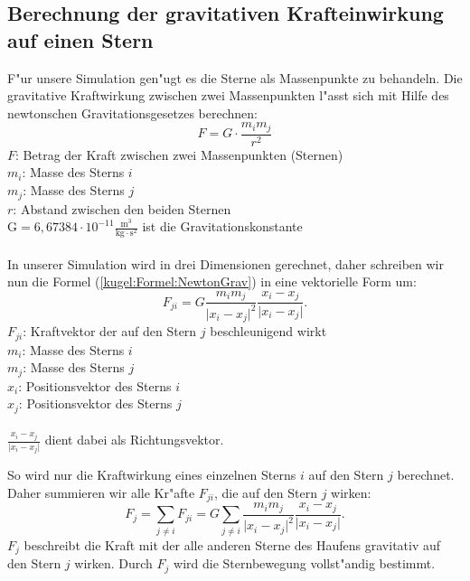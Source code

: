 \begin{refsection}
	\subsection{Berechnung der gravitativen Krafteinwirkung auf einen Stern} \label{kugel:subsection:Kraftformel}
	F"ur unsere Simulation gen"ugt es die Sterne als Massenpunkte zu behandeln. 
	Die gravitative Kraftwirkung zwischen zwei Massenpunkten l"asst sich mit Hilfe des newtonschen Gravitationsgesetzes berechnen:
	\begin{equation}
		F = G \cdot \dfrac{m_i m_j}{r^2}
		\label{kugel:Formel:NewtonGrav}
	\end{equation}
	$F$: Betrag der Kraft zwischen zwei Massenpunkten (Sternen) \\
	$m_i$: Masse des Sterns $i$ \\
	$m_j$: Masse des Sterns $j$ \\
	$r$: Abstand zwischen den beiden Sternen \\
	$\mathrm{G = 6,67384 \cdot 10^{-11} \frac{m^3}{kg \cdot s^2}}$ ist die Gravitationskonstante \\ \\
	In unserer Simulation wird in drei Dimensionen gerechnet, daher schreiben wir nun die Formel (\ref{kugel:Formel:NewtonGrav}) in eine vektorielle Form um:
	\begin{equation}
		F_{ji} = G \dfrac{m_i m_j}{\lvert x_i -  x_j \lvert^2} \dfrac{x_i - x_j}{\lvert x_i - x_j \lvert}
		\label{kugel:Formel:NewtonGravVek}.
	\end{equation}
	$F_{ji}$: Kraftvektor der auf den Stern $j$ beschleunigend wirkt \\
	$m_i$: Masse des Sterns $i$ \\
	$m_j$: Masse des Sterns $j$ \\
	$x_i$: Positionsvektor des Sterns $i$ \\
	$x_j$: Positionsvektor des Sterns $j$  \\ \\
	$\displaystyle \frac{ x_i -  x_j}{\lvert  x_i -  x_j \lvert}$ dient dabei als Richtungsvektor.
	
	So wird nur die Kraftwirkung eines einzelnen Sterns $i$ auf den Stern $j$ berechnet.
	Daher summieren wir alle Kr"afte $F_{ji}$, die auf den Stern $j$ wirken:
	\begin{equation}
		 F_j = \sum_{j \neq i} F_{ji} = G \sum_{j \neq i} \dfrac{m_i m_j}{\lvert x_i - x_j \lvert^2} \dfrac{x_i - x_j}{\lvert x_i - x_j \lvert}
		\label{kugel:Formel:NewtonGravVekSum}.
	\end{equation}
	$F_j$ beschreibt die Kraft mit der alle anderen Sterne des Haufens gravitativ auf den Stern $j$ wirken.
	Durch $F_j$ wird die Sternbewegung vollst"andig bestimmt.
		

\end{refsection}
